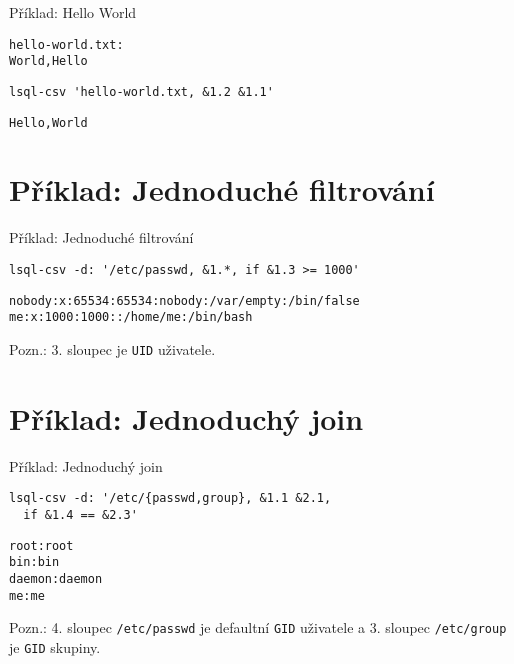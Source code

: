 \documentclass{beamer}
\def\icode#1{\texttt{#1}}
\begin{document}
\begin{frame}[fragile]{Příklad: Hello World}

\begin{verbatim}
hello-world.txt:
World,Hello
\end{verbatim}

\vskip 0.5cm

\begin{verbatim}
lsql-csv 'hello-world.txt, &1.2 &1.1'
\end{verbatim}
	
\begin{verbatim}
Hello,World
\end{verbatim}

\end{frame}

\section{Příklad: Jednoduché filtrování}
\begin{frame}[fragile]{Příklad: Jednoduché filtrování}

\begin{verbatim}
lsql-csv -d: '/etc/passwd, &1.*, if &1.3 >= 1000'
\end{verbatim}

\begin{verbatim}
nobody:x:65534:65534:nobody:/var/empty:/bin/false
me:x:1000:1000::/home/me:/bin/bash
\end{verbatim}

\vskip 1cm

Pozn.: 3. sloupec je \icode{UID} uživatele.

\end{frame}


\section{Příklad: Jednoduchý join}
\begin{frame}[fragile]{Příklad: Jednoduchý join}
\begin{verbatim}
lsql-csv -d: '/etc/{passwd,group}, &1.1 &2.1, 
  if &1.4 == &2.3'
\end{verbatim}

\begin{verbatim}
root:root
bin:bin
daemon:daemon
me:me
\end{verbatim}

\vskip 1cm

Pozn.: 4. sloupec \icode{/etc/passwd} je defaultní \icode{GID} uživatele a 3. sloupec \icode{/etc/group} je \icode{GID} skupiny.

\end{frame}
\end{document}
